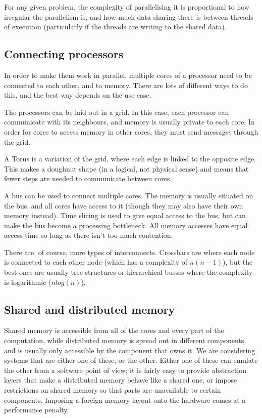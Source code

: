 For any given problem, the complexity of parallelising it is proportional to how
irregular the parallelism is, and how much data sharing there is between threads
of execution (particularly if the threads are writing to the shared data).

\subsection{Connecting processors}

In order to make them work in parallel, multiple cores of a processor need to be
connected to each other, and to memory. There are lots of different ways to do
this, and the best way depends on the use case.

\begin{description}
  \item The processors can be laid out in a grid. In this case, each processor
  can communicate with its neighbours, and memory is usually private to each 
  core. In order for cores to access memory in other cores, they must send 
  messages through the grid.
  \item A Torus is a variation of the grid, where each edge is linked to the 
  opposite edge. This makes a doughnut shape (in a logical, not physical sense)
  and means that fewer steps are needed to communicate between cores.
  \item A bus can be used to connect multiple cores. The memory is usually
  situated on the bus, and all cores have access to it (though they may also
  have their own memory instead). Time slicing is used to give equal access to 
  the bus, but can make the bus become a processing bottleneck. All memory
  accesses have equal access time so long as there isn't too much contention.
\end{description}

There are, of course, more types of interconnects. Crossbars are where each node
is connected to each other node (which has a complexity of $n(n-1)$), but the
best ones are usually tree structures or hierarchical busses where the
complexity is logarithmic ($n log(n)$).

\subsection{Shared and distributed memory}

Shared memory is accessible from all of the cores and every part of the
computation, while distributed memory is spread out in different components, and
is usually only accessible by the component that owns it. We are considering
systems that are either one of these, or the other. Either one of these can
emulate the other from a software point of view; it is fairly easy to provide
abstraction layers that make a distributed memory behave like a shared one, or
impose restrictions on shared memory so that parts are unavailable to certain
components. Imposing a foreign memory layout onto the hardware comes at a
performance penalty.

